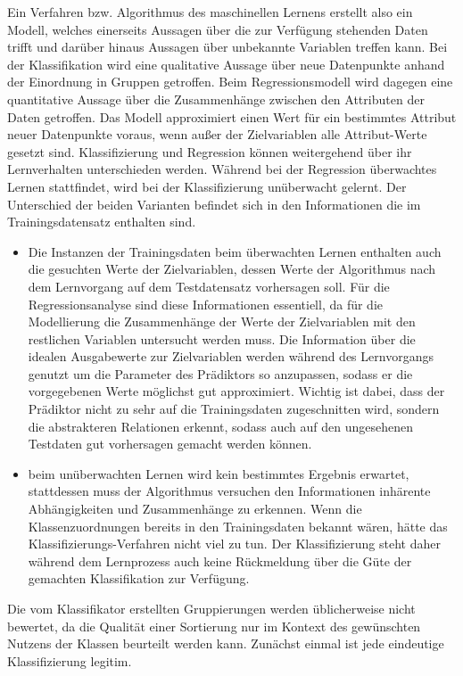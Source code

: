 \documentclass[
	12pt,
	a4paper,
	BCOR10mm,
	DIV14,
	listof=totoc,
	bibliography=totoc,
	headsepline
]{scrreprt}
\begin{document}
Ein Verfahren bzw. Algorithmus des maschinellen Lernens erstellt also ein Modell, welches einerseits Aussagen über die zur Verfügung stehenden Daten trifft und darüber hinaus Aussagen über unbekannte Variablen treffen kann.
Bei der Klassifikation wird eine qualitative Aussage über neue Datenpunkte anhand der Einordnung in Gruppen getroffen.
Beim Regressionsmodell wird dagegen eine quantitative Aussage über die Zusammenhänge zwischen den Attributen der Daten getroffen. Das Modell approximiert einen Wert für ein bestimmtes Attribut neuer Datenpunkte voraus, wenn außer der Zielvariablen alle Attribut-Werte gesetzt sind.  
Klassifizierung und Regression können weitergehend über ihr Lernverhalten unterschieden werden.
Während bei der Regression überwachtes Lernen stattfindet, wird bei der Klassifizierung unüberwacht gelernt. Der Unterschied der beiden Varianten befindet sich in den Informationen die im Trainingsdatensatz enthalten sind.
\begin{itemize}
\item Die Instanzen der Trainingsdaten beim überwachten Lernen enthalten auch die gesuchten Werte der Zielvariablen, dessen Werte der Algorithmus nach dem Lernvorgang auf dem Testdatensatz vorhersagen soll.
Für die Regressionsanalyse sind diese Informationen essentiell, da für die Modellierung die Zusammenhänge der Werte der Zielvariablen mit den restlichen Variablen untersucht werden muss.
Die Information über die idealen Ausgabewerte zur Zielvariablen werden während des Lernvorgangs genutzt um die Parameter des Prädiktors so anzupassen, sodass er die vorgegebenen Werte möglichst gut approximiert. Wichtig ist dabei, dass der Prädiktor nicht zu sehr auf die Trainingsdaten zugeschnitten wird, sondern die abstrakteren Relationen erkennt, sodass auch auf den ungesehenen Testdaten gut vorhersagen gemacht werden können.
\item beim unüberwachten Lernen wird kein bestimmtes Ergebnis erwartet, stattdessen muss der Algorithmus versuchen den Informationen inhärente Abhängigkeiten und Zusammenhänge zu erkennen.
Wenn die Klassenzuordnungen bereits in den Trainingsdaten bekannt wären, hätte das Klassifizierungs-Verfahren nicht viel zu tun. 
Der Klassifizierung steht daher während dem Lernprozess auch keine Rückmeldung über die Güte der gemachten Klassifikation zur Verfügung. 
\end{itemize}

Die vom Klassifikator erstellten Gruppierungen werden üblicherweise nicht bewertet, da die Qualität einer Sortierung nur im Kontext des gewünschten Nutzens der Klassen beurteilt werden kann.
Zunächst einmal ist jede eindeutige Klassifizierung legitim.
\end{document}
